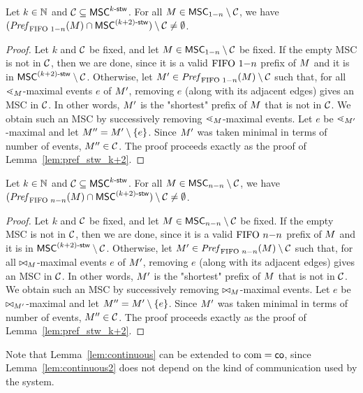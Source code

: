 \begin{lemma}\label{lem:onen_pref_stw_k+2}
	Let $k \in \mathbb{N}$ and $\mathcal{C} \subseteq \mathsf{MSC}^{k\textup{-}\mathsf{stw}}$. For all
	$M \in \mathsf{MSC}_{1\mathsf{-}n} \setminus \mathcal{C}$, we have
	$(\mathit{Pref}_{\text{FIFO } 1\mathsf{-}n}(M) \cap \mathsf{MSC}^{(k+2)\textup{-}\mathsf{stw}}) \setminus \mathcal{C} \neq \emptyset$.
\end{lemma}
\begin{proof}
	Let $k$ and $\mathcal{C}$ be fixed, and let
	$M\in \mathsf{MSC}_{1\mathsf{-}n} \setminus \mathcal{C}$ be fixed. If the empty MSC is not in $\mathcal{C}$, then we are done, since it is a valid $\text{FIFO } 1\mathsf{-}n$ prefix of $M$ and it is in $\mathsf{MSC}^{(k+2)\textup{-}\mathsf{stw}} \setminus \mathcal{C}$.
	Otherwise, let $M'\in \mathit{Pref}_{\text{FIFO } 1\mathsf{-}n}(M) \setminus \mathcal{C}$ such that, for all $\lessdot_M$-maximal events $e$ of $M'$, removing $e$ (along with its adjacent edges) gives an MSC in $\mathcal{C}$. In other words, $M'$ is the "shortest" prefix of $M$ that is not in $\mathcal{C}$. We obtain such an MSC by successively removing $\lessdot_M$-maximal events. Let $e$ be $\lessdot_{M'}$-maximal and let $M''=M' \setminus \{e\}$. Since $M'$ was taken minimal in terms of number of events,	$M''\in \mathcal{C}$.
	The proof proceeds exactly as the proof of Lemma~\ref{lem:pref_stw_k+2}. 
\end{proof}

\begin{lemma}\label{lem:nn_pref_stw_k+2}
	Let $k \in \mathbb{N}$ and $\mathcal{C} \subseteq \mathsf{MSC}^{k\textup{-}\mathsf{stw}}$. For all
	$M \in \mathsf{MSC}_{n\mathsf{-}n} \setminus \mathcal{C}$, we have
	$(\mathit{Pref}_{\text{FIFO } n\mathsf{-}n}(M) \cap \mathsf{MSC}^{(k+2)\textup{-}\mathsf{stw}}) \setminus \mathcal{C} \neq \emptyset$.
\end{lemma}
\begin{proof}
	Let $k$ and $\mathcal{C}$ be fixed, and let
	$M\in \mathsf{MSC}_{n\mathsf{-}n} \setminus \mathcal{C}$ be fixed. If the empty MSC is not in $\mathcal{C}$, then we are done, since it is a valid $\text{FIFO } n\mathsf{-}n$ prefix of $M$ and it is in $\mathsf{MSC}^{(k+2)\textup{-}\mathsf{stw}} \setminus \mathcal{C}$.
	Otherwise, let $M'\in \mathit{Pref}_{\text{FIFO } n\mathsf{-}n}(M) \setminus \mathcal{C}$ such that, for all $\bowtie_M$-maximal events $e$ of $M'$, removing $e$ (along with its adjacent edges) gives an MSC in $\mathcal{C}$. In other words, $M'$ is the "shortest" prefix of $M$ that is not in $\mathcal{C}$. We obtain such an MSC by successively removing $\bowtie_M$-maximal events. Let $e$ be $\bowtie_{M'}$-maximal and let $M''=M' \setminus \{e\}$. Since $M'$ was taken minimal in terms of number of events,	$M''\in \mathcal{C}$.
	The proof proceeds exactly as the proof of Lemma~\ref{lem:pref_stw_k+2}. 
\end{proof}

Note that Lemma~\ref{lem:continuous} can be extended to $\textup{com} = \mathsf{co}$, since Lemma~\ref{lem:continuous2} does not depend on the kind of communication used by the system. 

